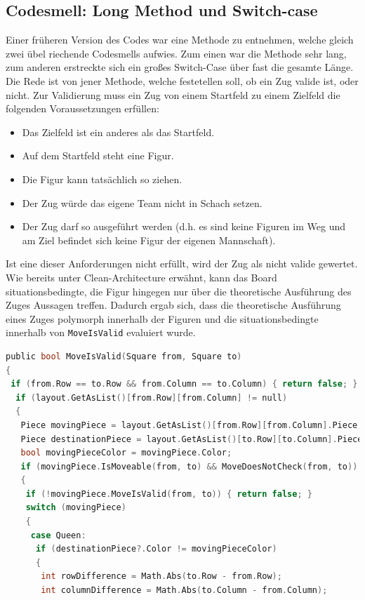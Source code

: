 \documentclass[
10pt, %
a4paper, %
oneside, %
headinclude,footinclude, %
BCOR5mm, %
]{scrartcl}
\begin{document}
\begin{onehalfspace}
\subsection{Codesmell: Long Method und Switch-case}
Einer früheren Version des Codes war eine Methode zu entnehmen, welche gleich zwei übel riechende Codesmells aufwies. Zum einen war die Methode sehr lang, zum anderen erstreckte sich ein großes Switch-Case über fast die gesamte Länge. Die Rede ist von jener Methode, welche festetellen soll, ob ein Zug valide ist, oder nicht. Zur Validierung muss ein Zug von einem Startfeld zu einem Zielfeld die folgenden Voraussetzungen erfüllen:
\begin{center}
	\begin{itemize}
		\item Das Zielfeld ist ein anderes als das Startfeld.
		\item Auf dem Startfeld steht eine Figur.
		\item Die Figur kann tatsächlich so ziehen.
		\item Der Zug würde das eigene Team nicht in Schach setzen.
		\item Der Zug darf so ausgeführt werden (d.h. es sind keine Figuren im Weg und am Ziel befindet sich keine Figur der eigenen Mannschaft).
	\end{itemize}
\end{center}
Ist eine dieser Anforderungen nicht erfüllt, wird der Zug als nicht valide gewertet. Wie bereits unter Clean-Architecture erwähnt, kann das Board situationsbedingte, die Figur hingegen nur über die theoretische Ausführung des Zuges Aussagen treffen. Dadurch ergab sich, dass die theoretische Ausführung eines Zuges polymorph innerhalb der Figuren und die situationsbedingte innerhalb von \texttt{MoveIsValid} evaluiert wurde. 
\vspace{0.5cm}

\begin{lstlisting}[language=c, style=mStyle]
public bool MoveIsValid(Square from, Square to)
{
 if (from.Row == to.Row && from.Column == to.Column) { return false; }
  if (layout.GetAsList()[from.Row][from.Column] != null)
  {
   Piece movingPiece = layout.GetAsList()[from.Row][from.Column].Piece;
   Piece destinationPiece = layout.GetAsList()[to.Row][to.Column].Piece;
   bool movingPieceColor = movingPiece.Color;
   if (movingPiece.IsMoveable(from, to) && MoveDoesNotCheck(from, to))
   {
	if (!movingPiece.MoveIsValid(from, to)) { return false; }
	switch (movingPiece)
	{
	 case Queen:
	  if (destinationPiece?.Color != movingPieceColor)
	  {
	   int rowDifference = Math.Abs(to.Row - from.Row);
	   int columnDifference = Math.Abs(to.Column - from.Column);


\end{lstlisting}
\end{onehalfspace}
\end{document}
